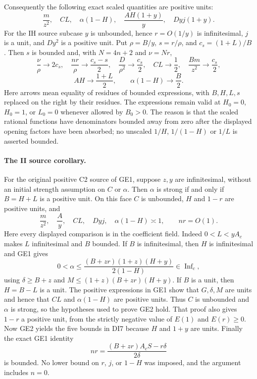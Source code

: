 Consequently the following exact scaled quantities are positive units:
\[
 \frac m{z^2},\quad CL,\quad\alpha(1-H),\quad
 \frac{AH(1+y)}y,\quad Dyj(1+y).
\tag{GE2}
\]
For the IH source subcase $y$ is unbounded, hence $r=O(1/y)$ is
infinitesimal, $j$ is a unit, and $Dy^2$ is a positive unit.
Put $\rho=B/y$, $s=r/\rho$, and $c_s=(1+L)/B$.
Then $s$ is bounded and, with $N=4n+2$ and $\nu=Nr$,
\[
 \frac\nu\rho\longrightarrow2c_s,\quad
 \frac{nr}\rho\longrightarrow\frac{c_s-s}{2},\quad
 \frac D{\rho^2}\longrightarrow\frac{c_s}{2},\quad
 CL\longrightarrow\frac12,\quad
 \frac{Bm}{z^2}\longrightarrow\frac{c_s}{2},
\]
\[
 AH\longrightarrow\frac{1+L}{2},\qquad
 \alpha(1-H)\longrightarrow\frac B2.
\tag{GE3}
\]
Here arrows mean equality of residues of bounded expressions, with
$B,H,L,s$ replaced on the right by their residues. The expressions
remain valid at $H_0=0$, $H_0=1$, or $L_0=0$ whenever allowed by $B_0>0$.
The reason is that the scaled rational functions have denominators
bounded away from zero after the displayed opening factors have
been absorbed; no unscaled $1/H$, $1/(1-H)$ or $1/L$ is asserted bounded.

\label{component:pfb3a83f3849a}
\label{pfb3a83f3849a:sec:common-ii}
\paragraph{The II source corollary.}
\label{sec:ii-source-bounds-refined}
For the original positive C2 source of GE1, suppose $z,y$ are
infinitesimal, without an initial strength assumption on $C$ or $\alpha$. Then $\alpha$ is strong if and only if $B=H+L$
is a positive unit.  On this face $C$ is unbounded, $H$ and
$1-r$ are positive units, and
\[
 \frac{m}{z^2},\quad\frac{A}{y},\quad CL,\quad Dyj,
 \quad\alpha(1-H)\asymp1,\qquad nr=O(1). \tag{DI7}
\]
Here every displayed comparison is in the coefficient field.
Indeed $0<L<yA_c$ makes $L$ infinitesimal and $B$ bounded.
If $B$ is infinitesimal, then $H$ is infinitesimal and GE1 gives
\[
 0<\alpha\le
 \frac{(B+zr)(1+z)(H+y)}{2(1-H)}\in\operatorname{Inf}_c,
\]
using $\delta\ge B+z$ and
$M\le(1+z)(B+zr)(H+y)$.  If $B$ is a unit, then
$H=B-L$ is a unit.  The positive expressions in GE1 show that
$G,\delta,M$ are units and hence that $CL$ and
$\alpha(1-H)$ are positive units.  Thus $C$ is unbounded
and $\alpha$ is strong, so the hypotheses used to prove GE2
hold.  That proof also gives $1-r$ a positive unit, from the
strictly negative value of $E(1)$ and $E(r)\ge0$.
Now GE2 yields the five bounds in DI7 because $H$ and $1+y$
are units.  Finally the exact GE1 identity
\[
 nr=\frac{(B+zr)A_cS-r\delta}{2\delta}
\]
is bounded.  No lower bound on $r$, $j$, or $1-H$ was imposed,
and the argument includes $n=0$.


